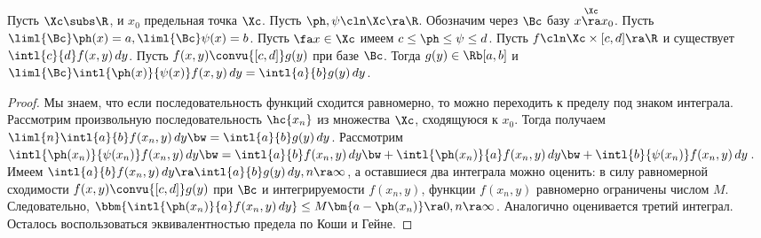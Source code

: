 \documentclass[a4paper]{article}
\newcommand{\intlab}{\intl{a}{b}}
\begin{document}
\begin{theorem}
Пусть $\Xc \subs \R$, и $x_0$ предельная точка $\Xc$. Пусть $\ph, \psi\cln \Xc \ra \R$. Обозначим
через $\Bc$ базу $x \overset{\Xc}{\ra} x_0$. Пусть $\liml{\Bc}\ph(x)=a, \liml{\Bc}\psi(x)=b$. Пусть
$\fa x \in \Xc$ имеем $c \le \ph \le \psi \le d$. Пусть $f\cln \Xc\times[c,d]\ra \R$ и существует
$\intl{c}{d}f(x,y)\,d y$. Пусть $f(x,y)\convu{[c,d]}g(y)$ при базе $\Bc$. Тогда $g(y)\in\Rb[a,b]$
и $\liml{\Bc}\intl{\ph(x)}{\psi(x)}f(x,y)\,d y=\intlab g(y)\,d y$.
\end{theorem}
\begin{proof}
Мы знаем, что если последовательность функций сходится равномерно, то можно переходить к пределу
под знаком интеграла. Рассмотрим произвольную последовательность $\hc{x_n}$ из множества $\Xc$,
сходящуюся к $x_0$. Тогда получаем $\liml{n}\intlab f(x_n,y)\,dy\bw=\intlab g(y)\,dy$. Рассмотрим
$\intl{\ph(x_n)}{\psi(x_n)}f(x_n,y)\,dy\bw=\intlab f(x_n,y)\,dy\bw+\intl{\ph(x_n)}{a}f(x_n,y)\,dy\bw+
\intl{b}{\psi(x_n)}f(x_n,y)\,dy$. Имеем $\intlab f(x_n,y)\,dy \ra \intlab g(y)\,d y, n \ra
\infty$, а оставшиеся два интеграла можно оценить: в силу равномерной сходимости
$f(x,y)\convu{[c,d]}g(y)$ при $\Bc$ и интегрируемости $f(x_n,y)$, функции $f(x_n,y)$ равномерно
ограничены числом $M$. Следовательно, $\bbm{\intl{\ph(x_n)}{a}f(x_n,y)\,d y} \le M\bm{a-\ph(x_n)} \ra
0, n \ra \infty$. Аналогично оценивается третий интеграл. Осталось воспользоваться эквивалентностью
предела по Коши и Гейне.
\end{proof}
\end{document}
